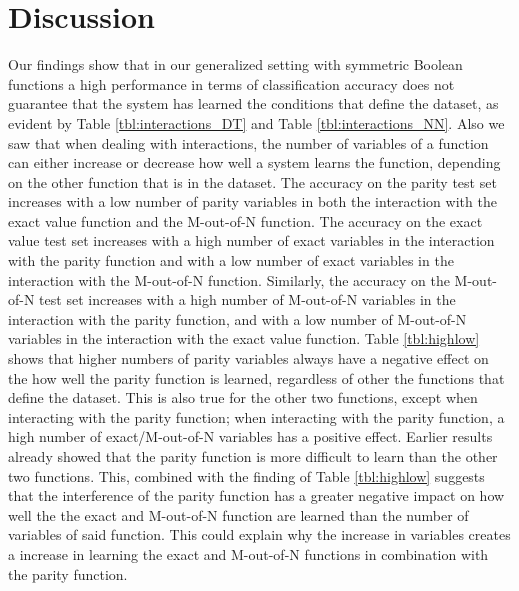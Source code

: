 \documentclass[letterpaper]{article} %
\begin{document}
\section{Discussion}
Our findings show that in our generalized setting with symmetric Boolean functions a high performance in terms of classification accuracy does not guarantee that the system has learned the conditions that define the dataset, as evident by Table \ref{tbl:interactions_DT} and Table \ref{tbl:interactions_NN}. Also we saw that when dealing with interactions, the number of variables of a function can either increase or decrease how well a system learns the function, depending on the other function that is in the dataset. The accuracy on the parity test set increases with a low number of parity variables in both the interaction with the exact value function and the M-out-of-N function. The accuracy on the exact value test set increases with a high number of exact variables in the interaction with the parity function and with a low number of exact variables in the interaction with the M-out-of-N function. Similarly, the accuracy on the M-out-of-N test set increases with a high number of M-out-of-N variables in the interaction with the parity function, and with a low number of M-out-of-N variables in the interaction with the exact value function. Table \ref{tbl:highlow}  shows that higher numbers of parity variables always have a negative effect on the how well the parity function is learned, regardless of other the functions that define the dataset. This is also true for the other two functions, except when interacting with the parity function; when interacting with the parity function, a high number of exact/M-out-of-N variables has a positive effect. Earlier results %
already showed that the parity function is more difficult to learn than the other two functions. This, combined with the finding of Table \ref{tbl:highlow} suggests that the interference of the parity function has a greater negative impact on how well the the exact and M-out-of-N function are learned than the number of variables of said function. This could explain why the increase in variables creates a increase in learning the exact and M-out-of-N functions in combination with the parity function. 
\end{document}
